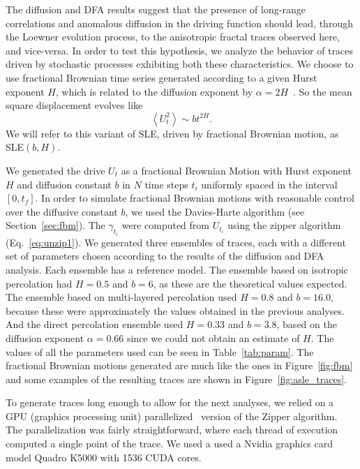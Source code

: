 The diffusion and DFA results suggest that the presence of long-range
correlations and anomalous diffusion in the driving function should lead,
through the Loewner evolution process, to the anisotropic fractal traces
observed here, and vice-versa. In order to test this hypothesis, we analyze the
behavior of traces driven by stochastic processes exhibiting both these
characteristics. We choose to use fractional Brownian time series generated
according to a given Hurst exponent $H$, which is related to the diffusion
exponent by $\alpha=2H$~\cite{Mandelbrot1968}. So the mean square displacement
evolves like
\begin{equation}
    \left\langle U_{t}^{2}\right\rangle \sim bt^{2H}.
\end{equation}
We will refer to this variant of SLE, driven by fractional Brownian motion, as
SLE$(b,H)$.

We generated the drive $U_t$ as a fractional Brownian Motion with Hurst
exponent $H$ and diffusion constant $b$ in $N$ time steps $t_i$ uniformly
spaced in the interval $[0, t_f]$. In order to simulate fractional Brownian
motions with reasonable control over the diffusive constant $b$, we used the
Davies-Harte algorithm (see Section~\ref{sec:fbm}). The $\gamma_{t_i}$ were
computed from $U_{t_i}$ using the zipper algorithm (Eq.~\ref{eq:unzip1}). We
generated three ensembles of traces, each with a different set of parameters
chosen according to the results of the diffusion and DFA analysis. Each
ensemble has a reference model. The ensemble based on isotropic percolation had
$H=0.5$ and $b=6$, as these are the theoretical values expected. The ensemble
based on multi-layered percolation used $H=0.8$ and $b=16.0$, because these
were approximately the values obtained in the previous analyses. And the direct
percolation ensemble used $H=0.33$ and $b=3.8$, based on the diffusion exponent
$\alpha=0.66$ since we could not obtain an estimate of $H$. The values of all
the parameters used can be seen in Table~\ref{tab:param}. The fractional
Brownian motions generated are much like the ones in Figure~\ref{fig:fbm} and
some examples of the resulting traces are shown in
Figure~\ref{fig:asle_traces}.

To generate traces long enough to allow for the next analyses, we relied on a
GPU (graphics processing unit) parallelized~\cite{Che2008} version of the
Zipper algorithm. The parallelization was fairly straightforward, where each
thread of execution computed a single point of the trace. We used a used a
Nvidia graphics card model Quadro K5000 with 1536 CUDA cores.

